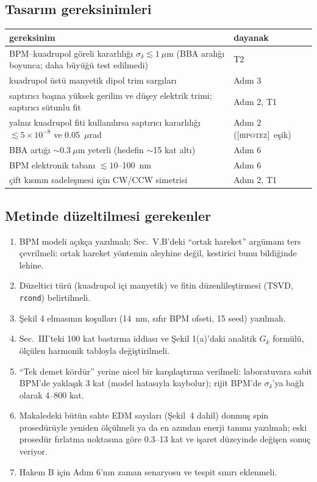\documentclass[11pt,a4paper]{article}
\newcommand{\kod}[1]{{\XeTeXinterchartokenstate=0\texttt{#1}}}
\newcommand{\HIP}{\textsc{[hipotez]}}
\begin{document}
\subsection{Tasarım gereksinimleri}
\begin{center}\small
\begin{tabularx}{\textwidth}{>{\raggedright\arraybackslash}Xl}
\toprule
gereksinim & dayanak \\
\midrule
BPM--kuadrupol göreli kararlılığı $\sigma_\delta\lesssim1~\mu$m (BBA aralığı boyunca; daha büyüğü test edilmedi) & T2 \\
kuadrupol üstü manyetik dipol trim sargıları & Adım 3 \\
saptırıcı başına yüksek gerilim ve düşey elektrik trimi; saptırıcı sütunlu fit & Adım 2, T1 \\
yalnız kuadrupol fiti kullanılırsa saptırıcı kararlılığı $\lesssim5\times10^{-8}$ ve 0.05~$\mu$rad & Adım 2 (\HIP\ eşik) \\
BBA artığı $\sim0.3~\mu$m yeterli (hedefin $\sim$15 kat altı) & Adım 6 \\
BPM elektronik tabanı $\lesssim10$--100~nm & Adım 6 \\
çift kısmın sadeleşmesi için CW/CCW simetrisi & Adım 2, T1 \\
\bottomrule
\end{tabularx}
\end{center}

\subsection{Metinde düzeltilmesi gerekenler}
\begin{enumerate}
\item BPM modeli açıkça yazılmalı; Sec.~V.B'deki ``ortak hareket'' argümanı ters çevrilmeli: ortak hareket
yöntemin aleyhine değil, kestirici bunu bildiğinde lehine.
\item Düzeltici türü (kuadrupol içi manyetik) ve fitin düzenlileştirmesi (TSVD, \kod{rcond}) belirtilmeli.
\item Şekil 4 elmasının koşulları (14~nm, sıfır BPM ofseti, 15 seed) yazılmalı.
\item Sec.~III'teki 100 kat bastırma iddiası ve Şekil 1(a)'daki analitik $G_k$ formülü, ölçülen harmonik
tabloyla değiştirilmeli.
\item ``Tek demet kördür'' yerine nicel bir karşılaştırma verilmeli: laboratuvara sabit BPM'de yaklaşık
3 kat (model hatasıyla kaybolur); rijit BPM'de $\sigma_\delta$'ya bağlı olarak 4--800 kat.
\item Makaledeki bütün sahte EDM sayıları (Şekil~4 dahil) donmuş spin prosedürüyle yeniden ölçülmeli ya
da en azından enerji tanımı yazılmalı; eski prosedür fırlatma noktasına göre 0.3--13 kat ve işaret
düzeyinde değişen sonuç veriyor.
\item Hakem B için Adım 6'nın zaman senaryosu ve tespit sınırı eklenmeli.
\end{enumerate}
\end{document}
